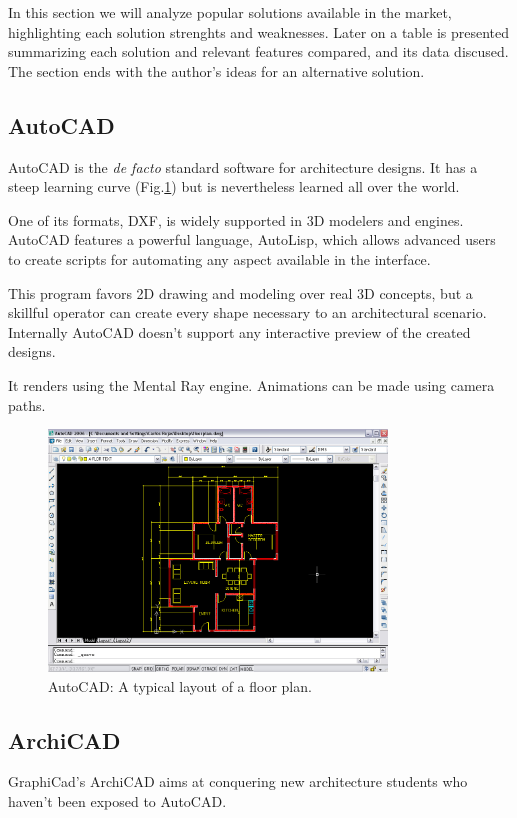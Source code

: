 
In this section we will analyze popular solutions available in the market,
highlighting each solution strenghts and weaknesses.
Later on a table is presented summarizing each solution and relevant features compared, and its
data discused.
The section ends with the author's ideas for an alternative solution.

\subsection{AutoCAD}
AutoCAD\cite{SITE-AUTOCAD} is the \emph{de facto} standard software for architecture designs.
It has a steep learning curve (Fig.\ref{FIG-AUTOCAD}) but is nevertheless
learned all over the world.

One of its formats, DXF, is widely supported in 3D modelers and engines.
AutoCAD features a powerful language, AutoLisp, which allows advanced users to create scripts for
automating any aspect available in the interface.

This program favors 2D drawing and modeling over real 3D concepts,
but a skillful operator can create every shape necessary to an architectural scenario.
Internally AutoCAD doesn't support any interactive preview of the created designs.

It renders using the Mental Ray\nocite{SITE-MENTAL} engine.
Animations can be made using camera paths.

\begin{figure}[!ht]
    \centering
    \includegraphics[width=9cm]{gfx/autocad-1.png}
    \caption{AutoCAD: A typical layout of a floor plan.}
    \label{FIG-AUTOCAD}
\end{figure}

\subsection{ArchiCAD}
GraphiCad's ArchiCAD\cite{SITE-ARCHICAD} aims at conquering new architecture students who haven't been exposed to AutoCAD.


